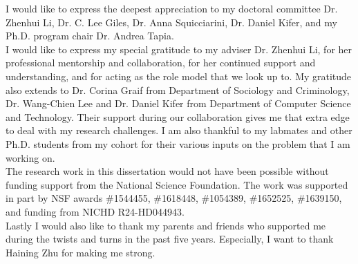 

I would like to express the deepest appreciation to my doctoral committee Dr. Zhenhui Li, Dr. C. Lee Giles, Dr. Anna Squicciarini, Dr. Daniel Kifer, and my Ph.D. program chair Dr. Andrea Tapia. \\

I would like to express my special gratitude to my adviser Dr. Zhenhui Li, for her professional mentorship and collaboration, for her continued support and understanding, and for acting as the role model that we look up to. My gratitude also extends to Dr. Corina Graif from Department of Sociology and Criminology, Dr. Wang-Chien Lee and Dr. Daniel Kifer from Department of Computer Science and Technology. Their support during our collaboration gives me that extra edge to deal with my research challenges. I am also thankful to my labmates and other Ph.D. students from my cohort for their various inputs on the problem that I am working on. \\

The research work in this dissertation would not have been possible without funding support from the National Science Foundation. The work was supported in part by NSF awards \#1544455, \#1618448, \#1054389, \#1652525, \#1639150, and funding from NICHD R24-HD044943. \\

Lastly I would also like to thank my parents and friends who supported me during the twists and turns in the past five years. Especially, I want to thank Haining Zhu for making me strong.